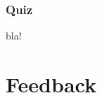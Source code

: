\documentclass{beamer}
\begin{document}
\begin{frame}
  \frametitle{Quiz}
  \begin{block}
    \lstQuiz
    \end{block}
  \begin{block}
    bla!
  \end{block}
\end{frame}

\section{Feedback}

\end{document}
